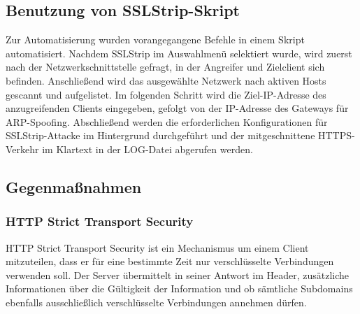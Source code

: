 \subsection*{Benutzung von SSLStrip-Skript}
Zur Automatisierung wurden vorangegangene Befehle in einem Skript automatisiert. Nachdem SSLStrip im Auswahlmenü selektiert wurde, wird zuerst nach der Netzwerkschnittstelle gefragt, in der Angreifer und Zielclient sich befinden. Anschließend wird das ausgewählte Netzwerk nach aktiven Hosts gescannt und aufgelistet. Im folgenden Schritt wird die Ziel-IP-Adresse des anzugreifenden Clients eingegeben, gefolgt von der IP-Adresse des Gateways für ARP-Spoofing. Abschließend werden die erforderlichen Konfigurationen für SSLStrip-Attacke im Hintergrund durchgeführt und der mitgeschnittene HTTPS-Verkehr im Klartext in der LOG-Datei abgerufen werden.
 
 
\subsection*{Gegenmaßnahmen}

\subsubsection*{HTTP Strict Transport Security}
HTTP Strict Transport Security ist ein Mechanismus um einem Client mitzuteilen, dass er für eine bestimmte Zeit nur verschlüsselte Verbindungen verwenden soll. Der Server übermittelt in seiner Antwort im Header, zusätzliche Informationen über die Gültigkeit der Information und ob sämtliche Subdomains ebenfalls ausschließlich verschlüsselte Verbindungen annehmen dürfen. \cite{hsts} \newpage

